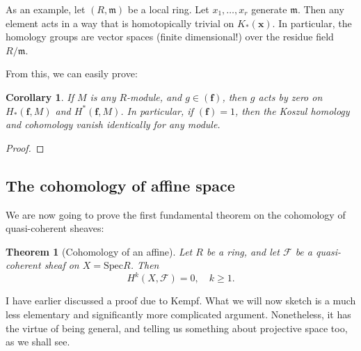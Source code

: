 \documentclass{article}
\newtheorem{theorem}{Theorem}
\newtheorem{corollary}{Corollary}
\begin{document}
As an example, let $(R, \mathfrak{m})$ be a local ring. Let $x_1, \dots, x_r$
generate $\mathfrak{m}$. Then any element acts in a way that is homotopically
trivial on $K_*(\mathbf{x})$. In particular, the homology groups are vector
spaces (finite dimensional!) over the residue field $R/\mathfrak{m}$.

From this, we can easily prove:
\begin{corollary} 
If $M$ is any $R$-module, and $g \in (\mathbf{f})$, then $g$ acts by zero on
$H_*(\mathbf{f}, M)$ and $H^*(\mathbf{f}, M)$. In particular, if
$(\mathbf{f})=1$, then the Koszul homology and cohomology vanish identically
for any module.
\end{corollary}
\begin{proof} 

\end{proof} 





\subsection{The cohomology of affine space}

We are now going to prove the first fundamental theorem on the cohomology of
quasi-coherent sheaves:
\begin{theorem}[Cohomology of an affine]
Let $R$ be a ring, and let $\mathcal{F}$ be a quasi-coherent sheaf on $X=\mathrm{Spec}
R$.  Then 
\[ H^k(  X, \mathcal{F})=0, \quad k \geq 1.\]
\end{theorem} 

I have earlier discussed a proof due to Kempf. What we will now sketch is a
much less elementary and significantly more complicated argument. Nonetheless,
it has the virtue of being general, and telling us something about projective
space too, as we shall see.
\end{document}
